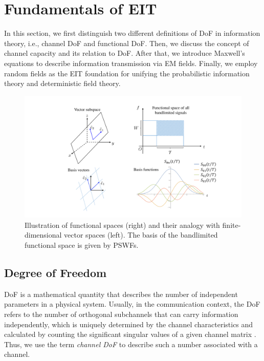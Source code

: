 \documentclass[journal,twocolumn]{IEEEtran}
\begin{document}
\section{Fundamentals of EIT}
In this section, we first distinguish two different definitions of DoF in information theory, i.e., channel DoF and functional DoF.  
Then, we discuss the concept of channel capacity and its relation to DoF. 
After that, we introduce Maxwell's equations to describe information transmission via EM fields. 
Finally, we employ random fields as the EIT foundation for unifying the probabilistic information theory and deterministic field theory. 

\begin{figure}
	\centering 
	\includegraphics[width=\linewidth]{figures/PSWF.pdf} 
	\caption{Illustration of functional spaces (right) and their analogy with finite-dimensional vector spaces (left). The basis of the bandlimited functional space is given by PSWFs. }
	\label{fig:PSWF}
\end{figure}

\subsection{Degree of Freedom}
\label{Sec_2_Subsec_1}
DoF is a mathematical quantity that describes the number of independent parameters in a physical system. 
Usually, in the communication context, the DoF refers to the number of orthogonal subchannels that can carry information independently, which is uniquely determined by the channel characteristics and calculated by counting the significant singular values of a given channel matrix \cite{goldsmith2003capacity}. 
Thus, we use the term {{\emph{channel DoF}}} to describe such a number associated with a channel.
\end{document}

